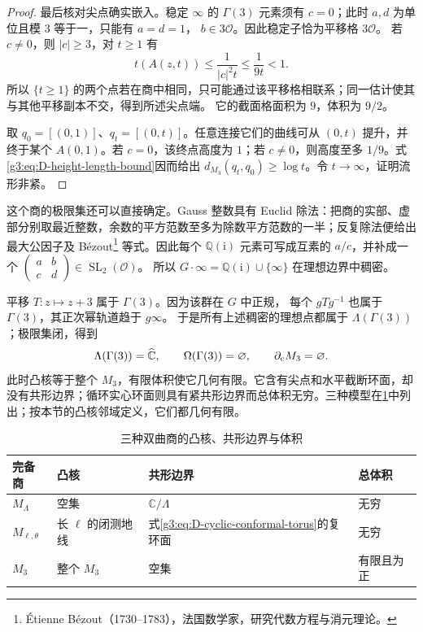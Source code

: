 \begin{proof}
	最后核对尖点确实嵌入。稳定 \(\infty\) 的 \(\Gamma(3)\) 元素须有
	\(c=0\)；此时 \(a,d\) 为单位且模 \(3\) 等于一，只能有 \(a=d=1\)，
	\(b\in3\mathcal O\)。因此稳定子恰为平移格 \(3\mathcal O\)。
	若 \(c\ne0\)，则 \(|c|\ge3\)，对 \(t\ge1\) 有
	\[
		t(A(z,t))\le\frac1{|c|^2t}\le\frac1{9t}<1.
	\]
	所以 \(\{t\ge1\}\) 的两个点若在商中相同，只可能通过该平移格相联系；同一估计使其与其他平移副本不交，得到所述尖点端。
	它的截面格面积为 \(9\)，体积为 \(9/2\)。

	取 \(q_0=[(0,1)]\)、\(q_t=[(0,t)]\)。任意连接它们的曲线可从
	\((0,t)\) 提升，并终于某个 \(A(0,1)\)。若 \(c=0\)，该终点高度为
	\(1\)；若 \(c\ne0\)，则高度至多 \(1/9\)。式
	\eqref{g3:eq:D-height-length-bound}因而给出
	\(d_{M_3}(q_t,q_0)\ge\log t\)。令 \(t\to\infty\)，证明流形非紧。
\end{proof}

这个商的极限集还可以直接确定。Gauss 整数具有 Euclid 除法：把商的实部、虚部分别取最近整数，余数的平方范数至多为除数平方范数的一半；反复除法便给出最大公因子及 Bézout\footnote{Étienne Bézout（1730--1783），法国数学家，研究代数方程与消元理论。} 等式。因此每个
\(\mathbb Q(\mathrm i)\) 元素可写成互素的 \(a/c\)，并补成一个
\(\begin{pmatrix}a&b\\c&d\end{pmatrix}\in\operatorname{SL}_2(\mathcal O)\)。
所以 \(G\cdot\infty=\mathbb Q(\mathrm i)\cup\{\infty\}\) 在理想边界中稠密。

\ProseParagraphBreak
平移 \(T:z\mapsto z+3\) 属于 \(\Gamma(3)\)。因为该群在 \(G\) 中正规，
每个 \(gTg^{-1}\) 也属于 \(\Gamma(3)\)，其正次幂轨道趋于 \(g\infty\)。
于是所有上述稠密的理想点都属于 \(\Lambda(\Gamma(3))\)；极限集闭，得到
\[
	\Lambda(\Gamma(3))=\widehat{\mathbb C\mkern0mu},\qquad
	\Omega(\Gamma(3))=\varnothing,\qquad
	\partial_{\mathrm c}M_3=\varnothing.
\]
此时凸核等于整个 \(M_3\)，有限体积使它几何有限。它含有尖点和水平截断环面，却没有共形边界；循环实心环面则具有紧共形边界而总体积无穷。三种模型在\cref{g3:tab:D-hyperbolic-quotient-models}中列出；按本节的凸核邻域定义，它们都几何有限。

\begin{table}[htbp]
	\centering
	\small
	\caption{三种双曲商的凸核、共形边界与体积}
	\label{g3:tab:D-hyperbolic-quotient-models}
	\begin{tabularx}{\textwidth}{@{}lXXX@{}}
		\toprule
		完备商 & 凸核 & 共形边界 & 总体积\\
		\midrule
		\(M_\Lambda\) & 空集 & \(\mathbb C/\Lambda\) & 无穷\\
		\(M_{\ell,\theta}\) & 长 \(\ell\) 的闭测地线 & 式\eqref{g3:eq:D-cyclic-conformal-torus}的复环面 & 无穷\\
		\(M_3\) & 整个 \(M_3\) & 空集 & 有限且为正\\
		\bottomrule
	\end{tabularx}
\end{table}

